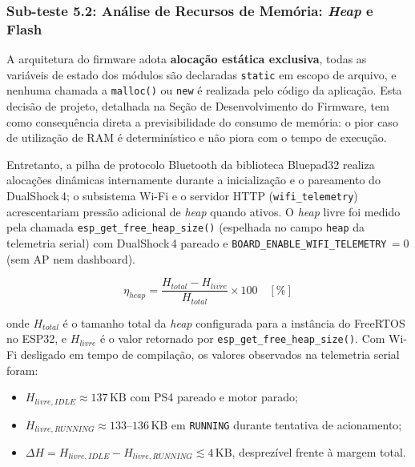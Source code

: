 \subsubsection{Sub-teste 5.2: Análise de Recursos de Memória: \textit{Heap} e Flash}

A arquitetura do firmware adota \textbf{alocação estática exclusiva}, todas as variáveis de estado dos módulos são declaradas \texttt{static} em escopo de arquivo, e nenhuma chamada a \texttt{malloc()} ou \texttt{new} é realizada pelo código da aplicação. Esta decisão de projeto, detalhada na Seção de Desenvolvimento do Firmware, tem como consequência direta a previsibilidade do consumo de memória: o pior caso de utilização de RAM é determinístico e não piora com o tempo de execução.

Entretanto, a pilha de protocolo Bluetooth da biblioteca Bluepad32 realiza alocações dinâmicas internamente durante a inicialização e o pareamento do DualShock\,4; o subsistema Wi-Fi e o servidor HTTP (\texttt{wifi\_telemetry}) acrescentariam pressão adicional de \textit{heap} quando ativos. O \textit{heap} livre foi medido pela chamada \texttt{esp\_get\_free\_heap\_size()} (espelhada no campo \texttt{heap} da telemetria serial) com DualShock\,4 pareado e \texttt{BOARD\_ENABLE\_WIFI\_TELEMETRY}\,$= 0$ (sem AP nem dashboard).

\begin{equation}
    \eta_{heap} = \frac{H_{total} - H_{livre}}{H_{total}} \times 100 \quad [\%]
    \label{eq:heap}
\end{equation}

\noindent onde $H_{total}$ é o tamanho total da \textit{heap} configurada para a instância do FreeRTOS no ESP32, e $H_{livre}$ é o valor retornado por \texttt{esp\_get\_free\_heap\_size()}. Com Wi-Fi desligado em tempo de compilação, os valores observados na telemetria serial foram:

\begin{itemize}
    \item $H_{livre,IDLE} \approx 137\,\text{KB}$ com PS4 pareado e motor parado;
    \item $H_{livre,RUNNING} \approx 133$--$136\,\text{KB}$ em \texttt{RUNNING} durante tentativa de acionamento;
    \item $\Delta H = H_{livre,IDLE} - H_{livre,RUNNING} \lesssim 4\,\text{KB}$, desprezível frente à margem total.
\end{itemize}

